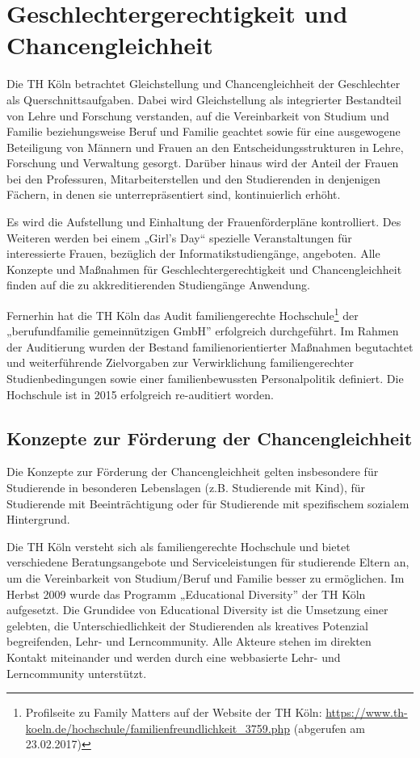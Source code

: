 \chapter{Geschlechtergerechtigkeit und
Chancengleichheit}\label{geschlechtergerechtigkeit-und-chancengleichheit}

Die TH Köln betrachtet Gleichstellung und Chancengleichheit der
Geschlechter als Querschnittsaufgaben. Dabei wird Gleichstellung als
integrierter Bestandteil von Lehre und Forschung verstanden, auf die
Vereinbarkeit von Studium und Familie beziehungsweise Beruf und Familie
geachtet sowie für eine ausgewogene Beteiligung von Männern und Frauen
an den Entscheidungsstrukturen in Lehre, Forschung und Verwaltung
gesorgt. Darüber hinaus wird der Anteil der Frauen bei den Professuren,
Mitarbeiterstellen und den Studierenden in denjenigen Fächern, in denen
sie unterrepräsentiert sind, kontinuierlich erhöht.

Es wird die Aufstellung und Einhaltung der Frauenförderpläne
kontrolliert. Des Weiteren werden bei einem „Girl's Day`` spezielle
Veranstaltungen für interessierte Frauen, bezüglich der
Informatikstudiengänge, angeboten. Alle Konzepte und Maßnahmen für
Geschlechtergerechtigkeit und Chancengleichheit finden auf die zu
akkreditierenden Studiengänge Anwendung.

Fernerhin hat die TH Köln das Audit familiengerechte
Hochschule\footnote{Profilseite zu Family Matters auf der Website der TH
  Köln:
  \url{https://www.th-koeln.de/hochschule/familienfreundlichkeit\_3759.php}
  (abgerufen am 23.02.2017)} der „berufundfamilie gemeinnützigen GmbH''
erfolgreich durchgeführt. Im Rahmen der Auditierung wurden der Bestand
familienorientierter Maßnahmen begutachtet und weiterführende
Zielvorgaben zur Verwirklichung familiengerechter Studienbedingungen
sowie einer familienbewussten Personalpolitik definiert. Die Hochschule
ist in 2015 erfolgreich re-auditiert worden.

\section{Konzepte zur Förderung der
Chancengleichheit}\label{konzepte-zur-fuxf6rderung-der-chancengleichheit}

Die Konzepte zur Förderung der Chancengleichheit gelten insbesondere für
Studierende in besonderen Lebenslagen (z.B. Studierende mit Kind), für
Studierende mit Beeinträchtigung oder für Studierende mit spezifischem
sozialem Hintergrund.

Die TH Köln versteht sich als familiengerechte Hochschule und bietet
verschiedene Beratungsangebote und Serviceleistungen für studierende
Eltern an, um die Vereinbarkeit von Studium/Beruf und Familie besser zu
ermöglichen. Im Herbst 2009 wurde das Programm „Educational Diversity''
der TH Köln aufgesetzt. Die Grundidee von Educational Diversity ist die
Umsetzung einer gelebten, die Unterschiedlichkeit der Studierenden als
kreatives Potenzial begreifenden, Lehr- und Lerncommunity. Alle Akteure
stehen im direkten Kontakt miteinander und werden durch eine webbasierte
Lehr- und Lerncommunity unterstützt.

